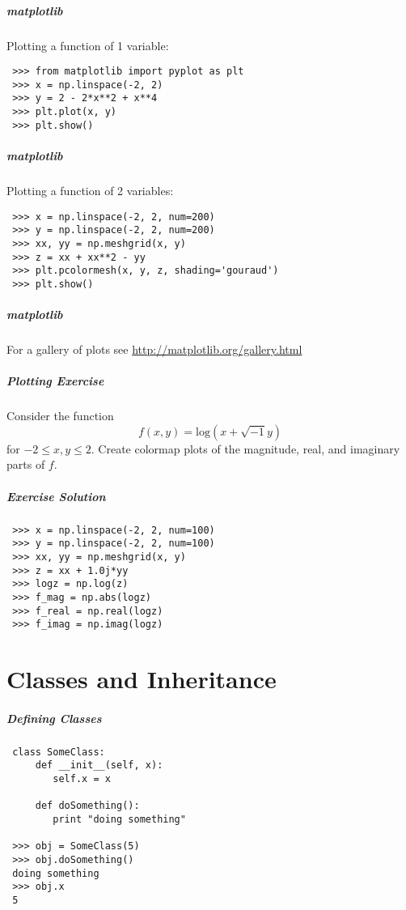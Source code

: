 \documentclass[hyperref={colorlinks, linkcolor=blue, urlcolor=blue}]{beamer}
\begin{document}
\begin{frame}[fragile]
  \frametitle{matplotlib}
  Plotting a function of 1 variable:
  \begin{lstlisting}
 >>> from matplotlib import pyplot as plt
 >>> x = np.linspace(-2, 2)
 >>> y = 2 - 2*x**2 + x**4
 >>> plt.plot(x, y)
 >>> plt.show()
  \end{lstlisting}
\end{frame}

\begin{frame}[fragile]
  \frametitle{matplotlib}
  Plotting a function of 2 variables:
  \begin{lstlisting}
 >>> x = np.linspace(-2, 2, num=200)
 >>> y = np.linspace(-2, 2, num=200)
 >>> xx, yy = np.meshgrid(x, y)
 >>> z = xx + xx**2 - yy
 >>> plt.pcolormesh(x, y, z, shading='gouraud')
 >>> plt.show()
  \end{lstlisting}
\end{frame}

\begin{frame}
  \frametitle{matplotlib}
  For a gallery of plots see
  \url{http://matplotlib.org/gallery.html} 
\end{frame}

\begin{frame}
  \frametitle{Plotting Exercise}
  Consider the function 
  \[ f(x,y) = \mathrm{log}(x+\sqrt{-1}y) \]
  for $-2 \leq x,y \leq 2$.
  Create colormap plots of the magnitude, real, and imaginary parts of $f$.
\end{frame}

\begin{frame}[fragile]
  \frametitle{Exercise Solution}

  \begin{lstlisting}
 >>> x = np.linspace(-2, 2, num=100)
 >>> y = np.linspace(-2, 2, num=100)
 >>> xx, yy = np.meshgrid(x, y)
 >>> z = xx + 1.0j*yy
 >>> logz = np.log(z)
 >>> f_mag = np.abs(logz)
 >>> f_real = np.real(logz)
 >>> f_imag = np.imag(logz)
  \end{lstlisting}
\end{frame}


\part{Classes and Inheritance} 

\begin{frame}[fragile]
  \frametitle{Defining Classes}
  \begin{lstlisting}
 class SomeClass:
     def __init__(self, x):
        self.x = x

     def doSomething():
        print "doing something"

 >>> obj = SomeClass(5)
 >>> obj.doSomething()
 doing something
 >>> obj.x
 5
  \end{lstlisting}
\end{frame}
\end{document}

